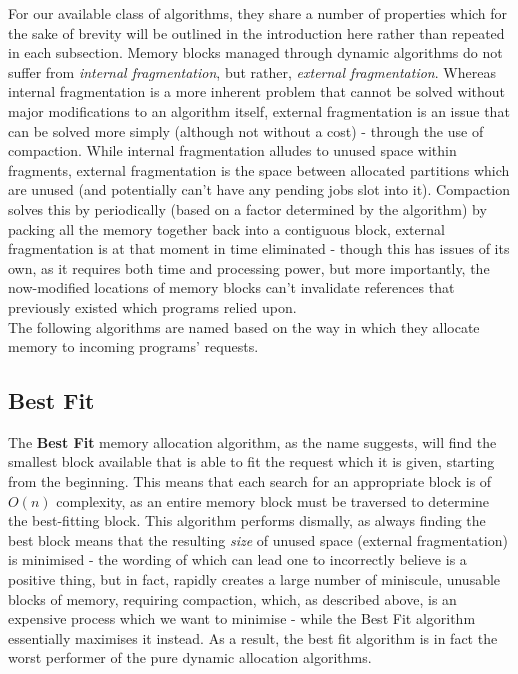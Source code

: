 \documentclass[11pt]{article}
\begin{document}
For our available class of algorithms, they share a number of properties which for the sake of brevity will be outlined in the introduction here rather than repeated in each subsection. Memory blocks managed through dynamic algorithms do not suffer from \textit{internal fragmentation}, but rather, \textit{external fragmentation}. Whereas internal fragmentation is a more inherent problem that cannot be solved without major modifications to an algorithm itself, external fragmentation is an issue that can be solved more simply (although not without a cost) - through the use of compaction. While internal fragmentation alludes to unused space within fragments, external fragmentation is the space between allocated partitions which are unused (and potentially can't have any pending jobs slot into it). Compaction solves this by periodically (based on a factor determined by the algorithm) by packing all the memory together back into a contiguous block, external fragmentation is at that moment in time eliminated - though this has issues of its own, as it requires both time and processing power, but more importantly, the now-modified locations of memory blocks can't invalidate references that previously existed which programs relied upon.\\

The following algorithms are named based on the way in which they allocate memory to incoming programs' requests.

\subsection{Best Fit}
The \textbf{Best Fit} memory allocation algorithm, as the name suggests, will find the smallest block available that is able to fit the request which it is given, starting from the beginning. This means that each search for an appropriate block is of $O(n)$ complexity, as an entire memory block must be traversed to determine the best-fitting block. This algorithm performs dismally, as always finding the best block means that the resulting \textit{size} of unused space (external fragmentation) is minimised - the wording of which can lead one to incorrectly believe is a positive thing, but in fact, rapidly creates a large number of miniscule, unusable blocks of memory, requiring compaction, which, as described above, is an expensive process which we want to minimise - while the Best Fit algorithm essentially maximises it instead. As a result, the best fit algorithm is in fact the worst performer of the pure dynamic allocation algorithms.\\
\end{document}
